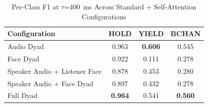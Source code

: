 \begin{table}[h]
\caption{Per-Class F1 at $\tau$=400~ms Across Standard + Self-Attention Configurations}
\label{tab:f1_per_class_ssa}
\small
\renewcommand{\arraystretch}{1.20}
\begin{tabular}{>{\raggedright\arraybackslash}p{4cm}ccc}
\toprule
Configuration & HOLD & YIELD & BCHAN \\
\midrule
Audio Dyad & 0.963 & \textbf{0.606} & 0.545 \\
Face Dyad & 0.922 & 0.111 & 0.278 \\
Speaker Audio + Listener Face & 0.878 & 0.453 & 0.280 \\
Speaker Audio + Face Dyad & 0.897 & 0.432 & 0.278 \\
Full Dyad & \textbf{0.964} & 0.541 & \textbf{0.560} \\
\bottomrule
\end{tabular}
\end{table}
